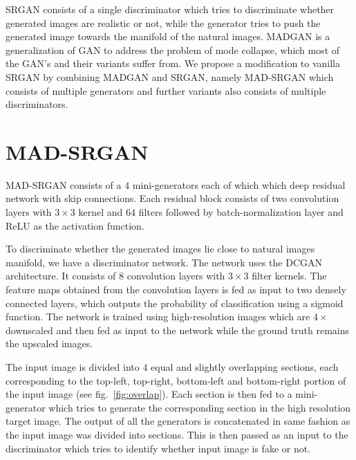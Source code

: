 \documentclass[12pt,a4paper,twocolumn]{article}
\begin{document}
        SRGAN consists of a single discriminator which tries to discriminate whether generated images are realistic or not, while the generator tries to push the generated image towards the manifold of the natural images.
        MADGAN \cite{madgan} is a generalization of GAN to address the problem of mode collapse, which most of the GAN's and their variants suffer from.
        We propose a modification to vanilla SRGAN by combining MADGAN and SRGAN, namely MAD-SRGAN which consists of multiple generators and further variants also consists of multiple discriminators.

    \section{MAD-SRGAN}
        MAD-SRGAN consists of a $4$ mini-generators each of which which deep residual network \cite{resnet} with skip connections.
        Each residual block consists of two convolution layers with $3\times3$ kernel and $64$ filters followed by batch-normalization \cite{batch-norm} layer and ReLU as the activation function.

        To discriminate whether the generated images lie close to natural images manifold, we have a discriminator network.
        The network uses the DCGAN \cite{dcgan} architecture.
        It consists of $8$ convolution layers with $3\times3$ filter kernels.
        The feature maps obtained from the convolution layers is fed as input to two densely connected layers, which outputs the probability of classification using a sigmoid function.
        The network is trained using high-resolution images which are $4\times$ downscaled and then fed as input to the network while the ground truth remains the upscaled images.

        The input image is divided into $4$ equal and slightly overlapping sections, each corresponding to the top-left, top-right, bottom-left and bottom-right portion of the input image (see fig.~\ref{fig:overlap}).
        Each section is then fed to a mini-generator which tries to generate the corresponding section in the high resolution target image.
        The output of all the generators is concatenated in same fashion as the input image was divided into sections.
        This is then passed as an input to the discriminator which tries to identify whether input image is fake or not.
\end{document}
